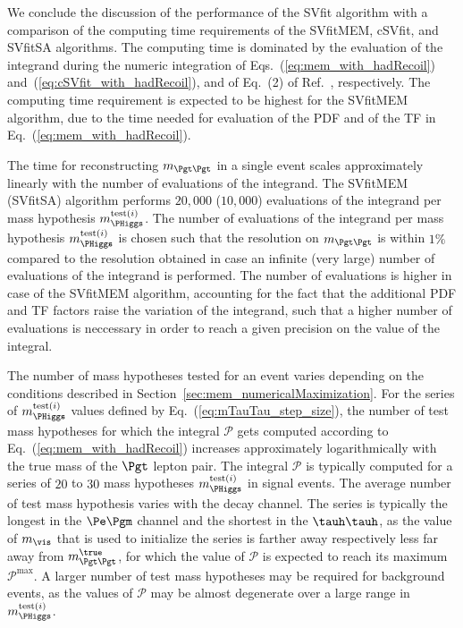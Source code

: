 We conclude the discussion of the performance of the SVfit algorithm
with a comparison of the computing time requirements of the SVfitMEM,
cSVfit, and SVfitSA algorithms.
The computing time is dominated by the
evaluation of the integrand during the numeric integration of Eqs.~(\ref{eq:mem_with_hadRecoil}) and~(\ref{eq:cSVfit_with_hadRecoil}), and of Eq.~(2) of Ref.~\cite{SVfit}, respectively.
The computing time requirement is expected to be
highest for the SVfitMEM algorithm, due to the time needed for evaluation of the PDF and of the TF in Eq.~(\ref{eq:mem_with_hadRecoil}).

The time for reconstructing $m_{\Pgt\Pgt}$ in a single event scales approximately linearly
with the number of evaluations of the integrand.
The SVfitMEM (SVfitSA) algorithm performs $20,000$ ($10,000$)
evaluations of the integrand per mass hypothesis
$m_{\PHiggs}^{\textrm{test}(i)}$.
The number of evaluations of the integrand per mass hypothesis $m_{\PHiggs}^{\textrm{test}(i)}$ is chosen such that the
resolution on $m_{\Pgt\Pgt}$ is within $1\%$ compared to the resolution obtained in case an infinite (very large) number of evaluations of the
integrand is performed.
The number of evaluations is higher in case of the SVfitMEM algorithm, 
accounting for the fact that the additional PDF and TF factors raise the variation of the integrand, 
such that a higher number of evaluations is neccessary in order to reach a given precision on the value of the integral.

The number of mass hypotheses tested for an event varies depending on the
conditions described in Section~\ref{sec:mem_numericalMaximization}.
For the series of $m_{\PHiggs}^{\textrm{test}(i)}$ values defined by Eq.~(\ref{eq:mTauTau_step_size}),
the number of test mass hypotheses for which the integral $\mathcal{P}$ gets computed according to Eq.~(\ref{eq:mem_with_hadRecoil}) 
increases approximately logarithmically with the true mass of the $\Pgt$ lepton pair. 
The integral $\mathcal{P}$
is typically computed for a series of $20$ to $30$ mass hypotheses $m_{\PHiggs}^{\textrm{test}(i)}$ in signal events.
The average number of test mass hypothesis varies with the decay channel.
The series is typically the longest in the $\Pe\Pgm$ channel and the shortest in the $\tauh\tauh$,
as the value of $m_{\vis}$ that is used to initialize the series is farther away respectively less far away from $m_{\Pgt\Pgt}^{\true}$,
for which the value of $\mathcal{P}$ is expected to reach its maximum $\mathcal{P}^{\textrm{max}}$.
A larger number of test mass hypotheses may be required for background events,
as the values of $\mathcal{P}$ may be almost degenerate over a large range in $m_{\PHiggs}^{\textrm{test}(i)}$.

